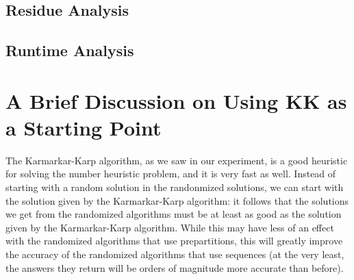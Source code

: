 \documentclass[10pt,letter]{article}
\begin{document}
\subsection{Residue Analysis}

\subsection{Runtime Analysis}

\section{A Brief Discussion on Using KK as a Starting Point}

The Karmarkar-Karp algorithm, as we saw in our experiment, is a good heuristic for solving the number heuristic problem, and it is very fast as well. Instead of starting with a random solution in the randonmized solutions, we can start with the solution given by the Karmarkar-Karp algorithm: it follows that the solutions we get from the randomized algorithms must be at least as good as the solution given by the Karmarkar-Karp algorithm. While this may have less of an effect with the randomized algorithms that use prepartitions, this will greatly improve the accuracy of the randomized algorithms that use sequences (at the very least, the answers they return will be orders of magnitude more accurate than before).
\end{document}
